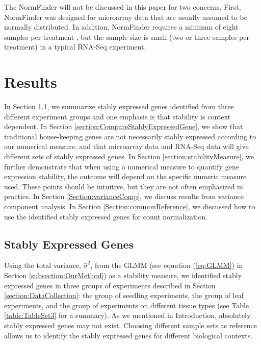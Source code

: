 \documentclass[11pt, a4paper]{article}
\begin{document}
The NormFinder will not be discussed in this paper for two concerns. First, NormFinder was designed for microarray data that are usually assumed to be normally distributed. %
 In addition, NormFinder requires a minimun of eight samples per treatment \citep{andersen2004normalization}, but the sample size is small (two or three samples per treatment) in a typical RNA-Seq experiment.   %



\section{Results} \label{section:Results}
In Section \ref{section:stablyExpressedGene}, we summarize stably expressed genes identified from three
different experiment groups and one emphasis is that stability is
context dependent. In Section \ref{section:CompareStablyExpressedGene}, we show that traditional house-keeping
genes are not necessarily stably expressed according to our numerical measure, 
and that microarray data and RNA-Seq data will give different sets of stably
expressed genes.  In Section \ref{section:stabilityMeasure}, we further demonstrate that when using a
numerical measure to quantify gene expression stability, the outcome will
depend on the specific numeric measure used.  These points should be
intuitive, but they are not often emphasized in practice.  In Section
\ref{Section:varianceComp}, we discuss results from variance component analysis. In Section
\ref{Section:commonReference}, we discussed how to use the identified stably
expressed genes for count normalization.

\subsection{Stably Expressed Genes}\label{section:stablyExpressedGene}
Using the total variance, $\hat\sigma^2$, from the GLMM (see
equation (\ref{eq:GLMM}) in Section \ref{subsection:OurMethod}) as a
stability measure, we identified stably expressed genes in three groups of
experiments described in Section \ref{section:DataCollection}: the group of seedling
experiments, the group of leaf experiments, and the group of experiments on
different tissue types (see Table \ref{table:TableSet3} for a summary).
 As we mentioned in
Introduction, absolutely stably expressed genes may not exist.  Choosing
different sample sets as reference allows us to identify the stably expressed
genes for different biological contexts.
\end{document}

